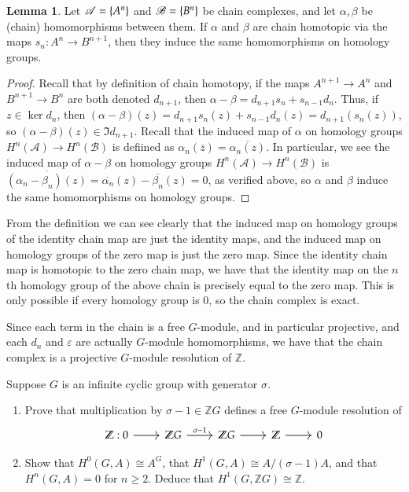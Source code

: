 \documentclass[12pt]{article}
\theoremstyle{definition}
\newenvironment{theorem}{\begin{mytheorem}}{\end{mytheorem}}
\newtheorem{lemma}{Lemma}
\theoremstyle{definitionstyle}
\def\mbb#1{\mathbb{#1}}
\def\ve{\varepsilon}
\newcommand{\SET}[1]{\Set{\mskip-\medmuskip #1 \mskip-\medmuskip}}
\newcommand{\Z}{\mbb Z}
\begin{document}
\begin{enumerate}[label=(\alph*)]
        \begin{lemma}
            Let $\mathscr{A} = \SET{A^n}$ and $\mathscr{B} = \SET{B^n}$ be chain complexes, and let $\alpha, \beta$ be (chain) homomorphisms between them. If $\alpha$ and $\beta$ are chain homotopic via the maps $s_n: A^n \to B^{n+1}$, then they induce the same homomorphisms on homology groups.
        \end{lemma}
        \begin{proof}
            Recall that by definition of chain homotopy, if the maps $A^{n+1} \to A^n$ and $B^{n+1} \to B^n$ are both denoted $d_{n+1}$, then $\alpha - \beta = d_{n+1}s_n + s_{n-1}d_n$. Thus, if $z \in \ker d_n$, then $(\alpha - \beta)(z) = d_{n+1}s_n(z) + s_{n-1}d_n(z) = d_{n+1}(s_n(z))$, so $(\alpha - \beta)(z) \in \Im d_{n+1}$. Recall that the induced map of $\alpha$ on homology groups $H^n(\mathscr{A}) \to H^n(\mathscr{B})$ is defiined as $\alpha_n(\overline z) = \overline{\alpha_n(z)}$. In particular, we see the induced map of $\alpha - \beta$ on homology groups $H^n(\mathscr{A}) \to H^n(\mathscr{B})$ is $\overline{(\alpha_n - \beta_n)(z)} = \overline{\alpha_n}(z) - \overline{\beta_n}(z) = 0$, as verified above, so $\alpha$ and $\beta$ induce the same homomorphisms on homology groups.
        \end{proof}
        From the definition we can see clearly that the induced map on homology groups of the identity chain map are just the identity maps, and the induced map on homology groups of the zero map is just the zero map. Since the identity chain map is homotopic to the zero chain map, we have that the identity map on the $n$th homology group of the above chain is precisely equal to the zero map. This is only possible if every homology group is 0, so the chain complex is exact. 
        
        Since each term in the chain is a free $G$-module, and in particular projective, and each $d_n$ and $\ve$ are actually $G$-module homomorphisms, we have that the chain complex is a projective $G$-module resolution of $\Z$.
    \end{enumerate}

    \newpage
    \begin{theorem}
        Suppose $G$ is an infinite cyclic group with generator $\sigma$. 
        \begin{enumerate}[label=(\alph*)]
            \item Prove that multiplication by $\sigma-1 \in \Z G$ defines a free $G$-module resolution of 
            \[\begin{tikzcd}
                {\Z: 0} & {\Z G} & {\Z G} & {\Z } & 0
                \arrow[from=1-1, to=1-2]
                \arrow["{\sigma-1}", from=1-2, to=1-3]
                \arrow[from=1-3, to=1-4]
                \arrow[from=1-4, to=1-5]
            \end{tikzcd}\]
            \item Show that $H^0(G,A) \cong A^G$, that $H^1(G, A) \cong A/(\sigma-1)A$, and that $H^n(G, A) = 0$ for $n \geq 2$. Deduce that $H^1(G, \Z G) \cong \Z$.
        \end{enumerate}
    \end{theorem}
    
\end{document}

